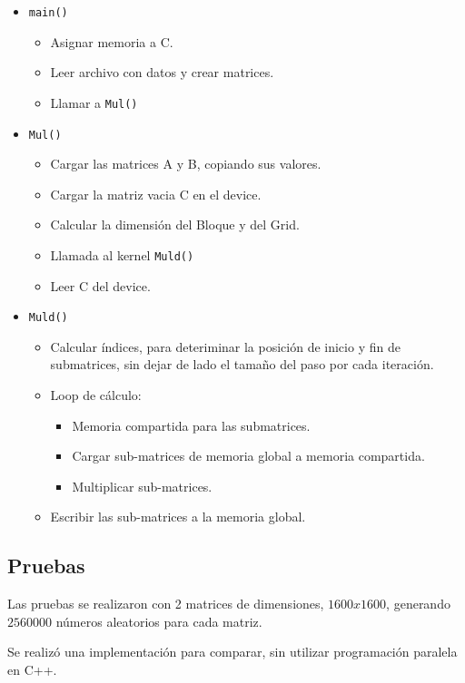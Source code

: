 \begin{itemize}
	\item \texttt{main()}
	\begin{itemize}
		\item Asignar memoria a C.
		\item Leer archivo con datos y crear matrices.
		\item Llamar a \texttt{Mul()}
	\end{itemize}
	\item \texttt{Mul()}
	\begin{itemize}
		\item Cargar las matrices A y B, copiando sus valores.
		\item Cargar la matriz vacia C en el device.
		\item Calcular la dimensión del Bloque y del Grid.
		\item Llamada al kernel \texttt{Muld()}
		\item Leer C del device.
	\end{itemize}
	\item \texttt{Muld()}
	\begin{itemize}
		\item Calcular índices, para deteriminar la posición de inicio y fin de submatrices,
		sin dejar de lado el tamaño del paso por cada iteración.
		\item Loop de cálculo:
		 \begin{itemize}
		 	\item Memoria compartida para las submatrices.
			\item Cargar sub-matrices de memoria global a memoria compartida.
			\item Multiplicar sub-matrices.
		 \end{itemize}
		\item Escribir las sub-matrices a la memoria global.
	\end{itemize}
\end{itemize}

\subsection{Pruebas}

Las pruebas se realizaron con 2 matrices de dimensiones,
$1600x1600$, generando $2560000$ números aleatorios
para cada matriz.

Se realizó una implementación para comparar,
sin utilizar programación paralela en C++.

